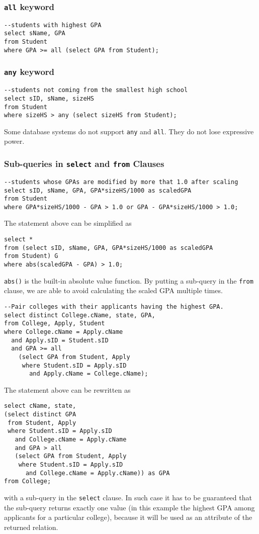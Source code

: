 \subsubsection{\texttt{all} keyword}
\begin{lstlisting}
--students with highest GPA
select sName, GPA
from Student
where GPA >= all (select GPA from Student);
\end{lstlisting}
\subsubsection{\texttt{any} keyword}
\begin{lstlisting}
--students not coming from the smallest high school
select sID, sName, sizeHS
from Student
where sizeHS > any (select sizeHS from Student);
\end{lstlisting}
Some database systems do not support \texttt{any} and \texttt{all}. They do not lose expressive power.
\subsubsection{Sub-queries in \texttt{select} and \texttt{from} Clauses}
\begin{lstlisting}
--students whose GPAs are modified by more that 1.0 after scaling
select sID, sName, GPA, GPA*sizeHS/1000 as scaledGPA
from Student
where GPA*sizeHS/1000 - GPA > 1.0 or GPA - GPA*sizeHS/1000 > 1.0;
\end{lstlisting}
The statement above can be simplified as 
\begin{lstlisting}
select * 
from (select sID, sName, GPA, GPA*sizeHS/1000 as scaledGPA
from Student) G
where abs(scaledGPA - GPA) > 1.0;
\end{lstlisting}
\texttt{abs()} is the built-in absolute value function. By putting a sub-query in the \texttt{from} clause, we are able to avoid calculating the scaled GPA multiple times.

\begin{lstlisting}
--Pair colleges with their applicants having the highest GPA.
select distinct College.cName, state, GPA, 
from College, Apply, Student
where College.cName = Apply.cName
  and Apply.sID = Student.sID
  and GPA >= all
    (select GPA from Student, Apply
     where Student.sID = Apply.sID
       and Apply.cName = College.cName);
\end{lstlisting}
The statement above can be rewritten as 
\begin{lstlisting}
select cName, state,
(select distinct GPA
 from Student, Apply
 where Student.sID = Apply.sID
   and College.cName = Apply.cName
   and GPA > all
   (select GPA from Student, Apply
    where Student.sID = Apply.sID
      and College.cName = Apply.cName)) as GPA
from College;
\end{lstlisting}
with a sub-query in the \texttt{select} clause. In such case it has to be guaranteed that the sub-query returns exactly one value (in this example the highest GPA among applicants for a particular college), because it will be used as an attribute of the returned relation.

